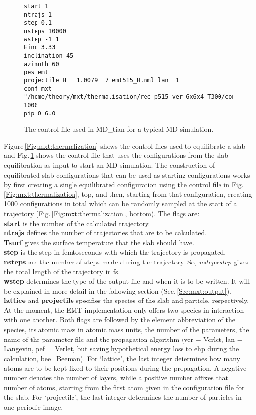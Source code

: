 \documentclass[twoside, 11pt, titlepage, captions=nooneline, a4paper, headsepline]{scrbook}%
\begin{document}
\begin{figure}[b!]
\centering
\begin{verbatim}
start 1
ntrajs 1
step 0.1
nsteps 10000
wstep -1 1
Einc 3.33
inclination 45
azimuth 60
pes emt
projectile H   1.0079  7 emt515_H.nml lan  1
conf mxt "/home/theory/mxt/thermalisation/rec_p515_ver_6x6x4_T300/conf" 1000
pip 0 6.0
\end{verbatim}
\caption{\label{Fig:mxt:MDsimulation}The control file used in MD\_tian for a typical MD-simulation.}
\end{figure}
Figure\,\ref{Fig:mxt:thermalization} shows the control files used to equilibrate a slab and Fig.\,\ref{Fig:mxt:MDsimulation} shows the control file that uses the configurations from the slab-equilibration as input to start an MD-simulation.
The construction of equilibrated slab configurations that can be used as starting configurations works by first creating a single equilibrated configuration using the control file in Fig.\,\ref{Fig:mxt:thermalization}, top, and then, starting from that configuration, creating 1000 configurations in total which can be randomly sampled at the start of a trajectory (Fig.\,\ref{Fig:mxt:thermalization}, bottom).
The flags are:\\
\textbf{start} is the number of the calculated trajectory.\\
\textbf{ntrajs} defines the number of trajectories that are to be calculated.\\
\textbf{Tsurf} gives the surface temperature that the slab should have.\\
\textbf{step} is the step in femtoseconds with which the trajectory is propagated.\\
\textbf{nsteps} are the number of steps made during the trajectory. So, \textit{nsteps}$\cdot$\textit{step} gives the total length of the trajectory in fs.\\
\textbf{wstep} determines the type of the output file and when it is to be written. It will be explained in more detail in the following section (Sec.\,\ref{Sec:mxt:output}).\\
\textbf{lattice} and \textbf{projectile} specifies the species of the slab and particle, respectively. At the moment, the EMT-implementation only offers two species in interaction with one another. Both flags are followed by the element abbreviation of the species, its atomic mass in atomic mass units, the number of the parameters, the name of the parameter file and the propagation algorithm (ver = Verlet, lan = Langevin, pef = Verlet, but saving hypothetical energy loss to ehp during the calculation, bee=Beeman). For `lattice', the last integer determines how many atoms are to be kept fixed to their positions during the propagation. A negative number denotes the number of layers, while a positive number affixes that number of atoms, starting from the first atom given in the configuration file for the slab. For `projectile', the last integer determines the number of particles in one periodic image.\\
\end{document}
